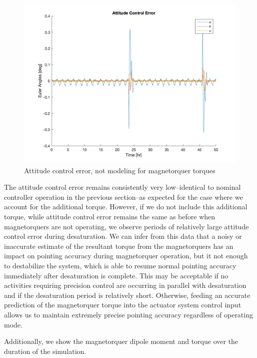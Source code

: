\begin{figure}[H]
\centering
\includegraphics[scale=0.3]{Images/ps10_error_open_loop.png}
\caption{Attitude control error, not modeling for magnetorquer torques}
\label{fig:ps10_error_open_loop}
\end{figure}

The attitude control error remains consistently very low–identical to nominal controller operation in the previous section–as expected for the case where we account for the additional torque. However, if we do not include this additional torque, while attitude control error remains the same as before when magnetorquers are not operating, we observe periods of relatively large attitude control error during desaturation. We can infer from this data that a noisy or inaccurate estimate of the resultant torque from the magnetorquers has an impact on pointing accuracy during magnetorquer operation, but it not enough to destabilize the system, which is able to resume normal pointing accuracy immediately after desaturation is complete. This may be acceptable if no activities requiring precision control are occurring in parallel with desaturation and if the desaturation period is relatively short. Otherwise, feeding an accurate prediction of the magnetorquer torque into the actuator system control input allows us to maintain extremely precise pointing accuracy regardless of operating mode.

Additionally, we show the magnetorquer dipole moment and torque over the duration of the simulation.

